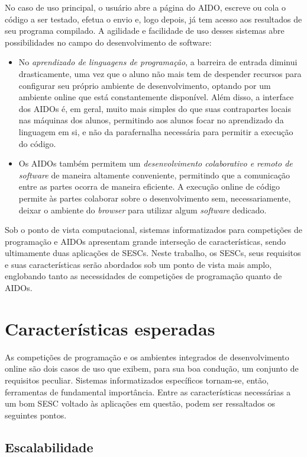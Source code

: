\documentclass[ruledheader, 12pt]{abnt}
\begin{document}
No caso de uso principal, o usuário abre a página do AIDO, escreve ou cola o código a ser testado, efetua o envio e, logo depois, já tem acesso aos resultados de seu programa compilado. A agilidade e facilidade de uso desses sistemas abre possibilidades no campo do desenvolvimento de software:
\begin{itemize}
	\item No \emph{aprendizado de linguagens de programação}, a barreira de entrada diminui drasticamente, uma vez que o aluno não mais tem de despender recursos para configurar seu próprio ambiente de desenvolvimento, optando por um ambiente online que está constantemente disponível. Além disso, a interface dos AIDOs é, em geral, muito mais simples do que suas contrapartes locais nas máquinas dos alunos, permitindo aos alunos focar no aprendizado da linguagem em si, e não da parafernalha necessária para permitir a execução do código.
	
	\item Os AIDOs também permitem um \emph{desenvolvimento colaborativo e remoto de software} de maneira altamente conveniente, permitindo que a comunicação entre as partes ocorra de maneira eficiente. A execução online de código permite às partes colaborar sobre o desenvolvimento sem, necessariamente, deixar o ambiente do \emph{browser} para utilizar algum \emph{software} dedicado.
\end{itemize}

Sob o ponto de vista computacional, sistemas informatizados para competições de programação e AIDOs apresentam grande interseção de características, sendo ultimamente duas aplicações de SESCs. Neste trabalho, os SESCs, seus requisitos e suas características serão abordados sob um ponto de vista mais amplo, englobando tanto as necessidades de competições de programação quanto de AIDOs.

\section{Características esperadas}

As competições de programação e os ambientes integrados de desenvolvimento online são dois casos de uso que exibem, para sua boa condução, um conjunto de requisitos peculiar. Sistemas informatizados específicos tornam-se, então, ferramentas de fundamental importância. Entre as características necessárias a um bom SESC voltado às aplicações em questão, podem ser ressaltados os seguintes pontos.

\subsection{Escalabilidade}
\end{document}
